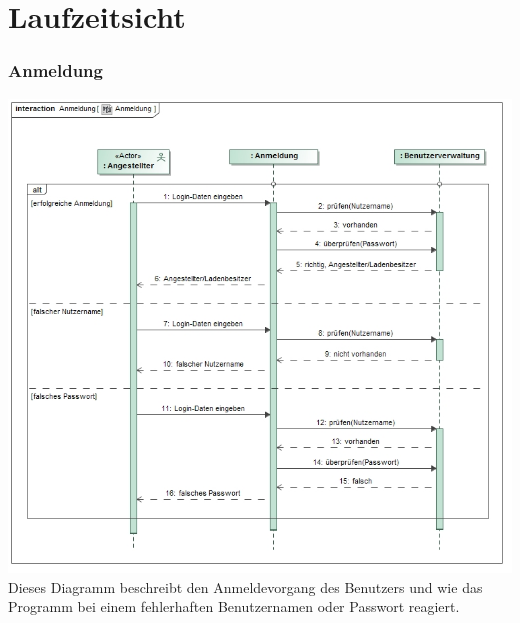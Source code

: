 \documentclass[pdftex,12pt,a4paper]{article}
\begin{document}
\section{Laufzeitsicht}
\subsubsection*{Anmeldung}
\includegraphics[width=1\textwidth]{../Pflichtenheft/images/anmeldung}
Dieses Diagramm beschreibt den Anmeldevorgang des Benutzers und wie das Programm bei einem fehlerhaften Benutzernamen oder Passwort reagiert.
\end{document}
